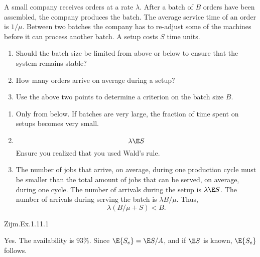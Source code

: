 \begin{question} 

  A small company receives orders at a rate $\lambda$.  After a batch
  of $B$ orders have been assembled, the company produces the batch.
  The average service time of an order is $1/\mu$. Between two batches
  the company has to re-adjust some of the machines before it can
  process another batch. A setup costs  $S$ time units.

\begin{enumerate}
\item Should the batch size be limited from above or below to ensure that the system remains stable? 
\item How many orders arrive on average during a setup?
\item Use the above two points to determine a criterion on the batch size $B$. 
\end{enumerate}

\begin{solution}
\begin{enumerate}
\item Only from below. If batches are very large, the fraction of time spent on setups becomes very small.
\item \begin{equation*}
    \lambda \E S
  \end{equation*}
Ensure you realized that you used Wald's rule.
\item  The number of jobs that arrive, on average, during one
  production cycle must be smaller than the total amount of jobs that
  can be served, on average, during one cycle.   The number of arrivals during the setup is $\lambda \E S$. The number of arrivals during serving the batch is $\lambda B/\mu$. Thus, 
  \begin{equation*}
    \lambda ( B/\mu + S) < B.
  \end{equation*}
\end{enumerate}
\end{solution}
\end{question}

\begin{question}
Zijm.Ex.1.11.1
 \begin{solution}
Yes. The availability is $93\%$. Since $\E{S_e} = \E S/A$, and if $\E S $ is known, $\E{S_e}$ follows.
\end{solution}
\end{question}


